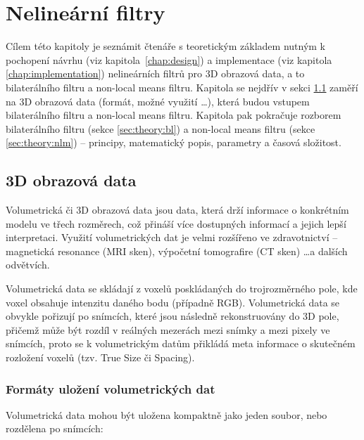 \chapter{Nelineární filtry}
\label{chap:theory}
Cílem této kapitoly je seznámit čtenáře s teoretickým základem nutným k pochopení návrhu (viz kapitola~\ref{chap:design}) a implementace (viz kapitola \ref{chap:implementation}) nelineárních filtrů pro 3D obrazová data, a to bilaterálního filtru a non-local means filtru. Kapitola se nejdřív v sekci \ref{sec:theory:volumetric_data} zaměří na 3D 
obrazová data (formát, možné využití \dots), která budou vstupem bilaterálního filtru a non-local means filtru. Kapitola pak pokračuje rozborem bilaterálního filtru (sekce \ref{sec:theory:bl}) a non-local means filtru (sekce \ref{sec:theory:nlm}) -- principy, matematický popis, parametry a časová složitost.

\section{3D obrazová data}
\label{sec:theory:volumetric_data}
Volumetrická či 3D obrazová data jsou data, která drží informace o konkrétním modelu ve třech rozměrech, což přináší více dostupných informací a jejich lepší interpretaci. Využití volumetrických dat je velmi rozšířeno ve zdravotnictví -- magnetická resonance (MRI sken), výpočetní tomografire (CT sken) \dots a dalších odvětvích.

Volumetrická data se skládají z voxelů poskládaných do trojrozměrného pole, kde voxel obsahuje intenzitu daného bodu (případně RGB). Volumetrická data se obvykle pořizují po snímcích, které jsou následně rekonstruovány do 3D pole, přičemž může být rozdíl v reálných mezerách mezi snímky a mezi pixely ve snímcích, proto se k volumetrickým datům přikládá meta informace o skutečném rozložení voxelů (tzv. True Size či Spacing).

\subsection*{Formáty uložení volumetrických dat}
Volumetrická data mohou být uložena kompaktně jako jeden soubor, nebo rozdělena po snímcích:


